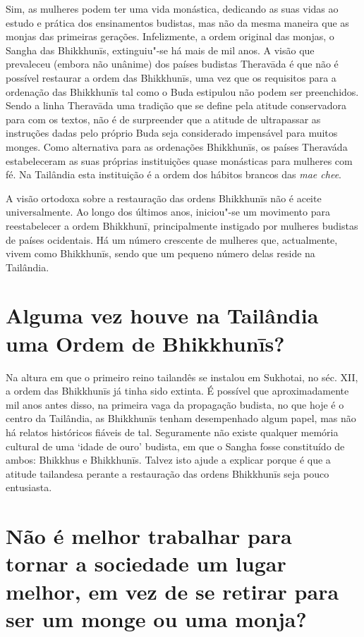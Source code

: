 Sim, as mulheres podem ter uma vida monástica, dedicando as suas vidas
ao estudo e prática dos ensinamentos budistas, mas não da mesma maneira
que as monjas das primeiras gerações. Infelizmente, a ordem original das
monjas, o Sangha das Bhikkhunīs, extinguiu"-se há mais de mil anos. A
visão que prevaleceu (embora não unânime) dos países budistas Theravāda
é que não é possível restaurar a ordem das Bhikkhunīs, uma vez que os
requisitos para a ordenação das Bhikkhunīs tal como o Buda estipulou não
podem ser preenchidos. Sendo a linha Theravāda uma tradição que se
define pela atitude conservadora para com os textos, não é de
surpreender que a atitude de ultrapassar as instruções dadas pelo
próprio Buda seja considerado impensável para muitos monges. Como
alternativa para as ordenações Bhikkhunīs, os países Theraváda
estabeleceram as suas próprias instituições quase monásticas para
mulheres com fé. Na Tailândia esta instituição é a ordem dos hábitos
brancos das \emph{mae chee}.

A visão ortodoxa sobre a restauração das ordens Bhikkhunīs não é aceite
universalmente. Ao longo dos últimos anos, iniciou"-se um movimento para
reestabelecer a ordem Bhikkhunī, principalmente instigado por mulheres
budistas de países ocidentais. Há um número crescente de mulheres que,
actualmente, vivem como Bhikkhunīs, sendo que um pequeno número delas
reside na Tailândia.

\section{Alguma vez houve na Tailândia uma Ordem de Bhikkhunīs?}

Na altura em que o primeiro reino tailandês se instalou em Sukhotai, no
séc. XII, a ordem das Bhikkhunīs já tinha sido extinta. É possível que
aproximadamente mil anos antes disso, na primeira vaga da propagação
budista, no que hoje é o centro da Tailândia, as Bhikkhunīs tenham
desempenhado algum papel, mas não há relatos históricos fiáveis de tal.
Seguramente não existe qualquer memória cultural de uma `idade de
ouro' budista, em que o Sangha fosse constituído de ambos: Bhikkhus e
Bhikkhunīs. Talvez isto ajude a explicar porque é que a atitude
tailandesa perante a restauração das ordens Bhikkhunīs seja pouco
entusiasta.

\section{Não é melhor trabalhar para tornar a sociedade um lugar melhor, em vez
  de se retirar para ser um monge ou uma monja?}

